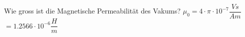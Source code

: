 
\begin{lk}{Wie gross ist die Magnetische Permeabilität des Vakums?}
	\LARGE{$ \mu_0 = 4 \cdot \pi \cdot 10^{-7} \dfrac{Vs}{Am} $ \\[12pt] $ = 1.2566  \cdot 10^{-6} \dfrac{H}{m}$}
\end{lk}